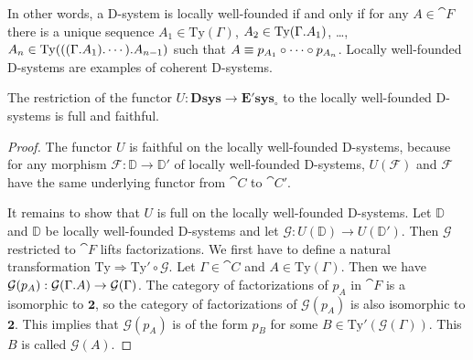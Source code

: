 \begin{rmk}
In other words, a D-system is locally well-founded if and only if
for any $A\in\cat{F}$ there is a unique sequence
$A_1\in\mathrm{Ty}(\Gamma)$, $A_2\in\mathrm{Ty}(\ctxext{\Gamma}{A_1})$, \ldots,
$A_n\in\mathrm{Ty}(\ctxext{{{\Gamma}{A_1}}{\cdots}}{A_{n-1}})$ such that
$A\equiv p_{A_1}\circ\cdots\circ p_{A_n}$. Locally well-founded D-systems 
are examples of coherent D-systems.
\end{rmk}

\begin{thm}
The restriction of the functor $U:\mathbf{Dsys}\to\mathbf{E'sys_{\circ}}$ to the
locally well-founded D-systems is full and faithful.
\end{thm}

\begin{proof}
The functor $U$ is faithful on the locally well-founded D-systems, because for any morphism 
$\mathcal{F}:\mathbb{D}\to\mathbb{D}'$ of locally well-founded D-systems, 
$U(\mathcal{F})$ and $\mathcal{F}$ have the same underlying functor
from $\cat{C}$ to $\cat{C}'$. 

It remains to show that $U$ is full on the locally well-founded D-systems. Let
$\mathbb{D}$ and $\mathbb{D}$ be locally well-founded D-systems and let $\mathcal{G}:U(\mathbb{D})
\to U(\mathbb{D}')$. Then $\mathcal{G}$ restricted to $\cat{F}$ lifts factorizations.
We  first have to define a natural transformation
$\mathrm{Ty}\Rightarrow \mathrm{Ty}'\circ\mathcal{G}$. Let
$\Gamma\in\cat{C}$ and $A\in\mathrm{Ty}(\Gamma)$. Then we have
$\mathcal{G}(p_A):\mathcal{G}(\ctxext{\Gamma}{A})\to \mathcal{G}(\Gamma)$.
The category of factorizations of $p_A$ in $\cat{F}$ is a isomorphic to $\mathbf{2}$,
so the category of factorizations of $\mathcal{G}(p_A)$ is also isomorphic to
$\mathbf{2}$. This implies that $\mathcal{G}(p_A)$ is of the form $p_B$ for
some $B\in\mathrm{Ty}'(\mathcal{G}(\Gamma))$. This $B$ is called $\mathcal{G}(A)$.


\end{proof}
